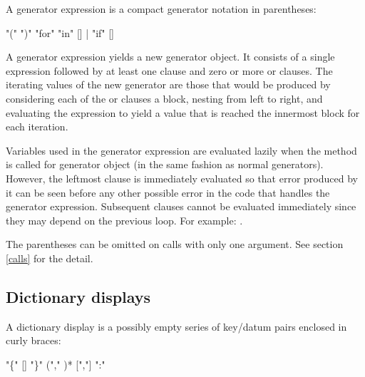 A generator expression is a compact generator notation in parentheses:

\begin{productionlist}
             {"("   ")"}
             {"for"  "in" 
              []}
             { | }
             {"if"  []}
\end{productionlist}

A generator expression yields a new generator object.
It consists of a single expression followed by at least one
 clause and zero or more  or 
clauses.  The iterating values of the new generator are those that
would be produced by considering each of the  or
 clauses a block, nesting from left to right, and
evaluating the expression to yield a value that is reached the
innermost block for each iteration.

Variables used in the generator expression are evaluated lazily
when the  method is called for generator object
(in the same fashion as normal generators). However, the leftmost
 clause is immediately evaluated so that error produced
by it can be seen before any other possible error in the code that
handles the generator expression.
Subsequent  clauses cannot be evaluated immediately since
they may depend on the previous  loop.
For example: .

The parentheses can be omitted on calls with only one argument.
See section \ref{calls} for the detail.


\subsection{Dictionary displays\label{dict}}

A dictionary display is a possibly empty series of key/datum pairs
enclosed in curly braces:

\begin{productionlist}
             {"\{" [] "\}"}
             { ("," )* [","]}
             { ":" }
\end{productionlist}


